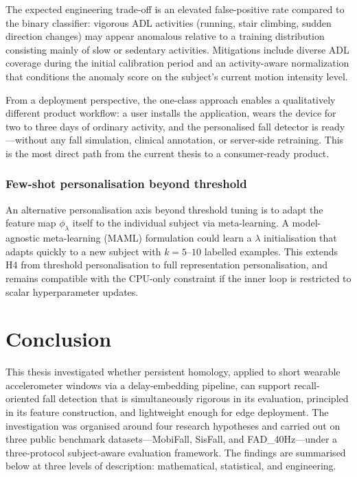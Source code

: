 \documentclass[onluarkali,ingilizce,yukseklisans,karton,LisansustuEgitim]{itutez}
\providecommand{\1}{\mathbf{1}}
\begin{document}
The expected engineering trade-off is an elevated false-positive rate compared to
the binary classifier: vigorous ADL activities (running, stair climbing, sudden
direction changes) may appear anomalous relative to a training distribution consisting
mainly of slow or sedentary activities.  Mitigations include diverse ADL coverage
during the initial calibration period and an activity-aware normalization that
conditions the anomaly score on the subject's current motion intensity level.

From a deployment perspective, the one-class approach enables a qualitatively
different product workflow: a user installs the application, wears the device for
two to three days of ordinary activity, and the personalised fall detector is
ready---without any fall simulation, clinical annotation, or server-side retraining.
This is the most direct path from the current thesis to a consumer-ready product.

\subsection{Few-shot personalisation beyond threshold}

An alternative personalisation axis beyond threshold tuning is to adapt the feature
map $\phi_\lambda$ itself to the individual subject via meta-learning.  A model-agnostic
meta-learning (MAML) formulation could learn a $\lambda$ initialisation that adapts
quickly to a new subject with $k=5$--$10$ labelled examples.  This extends H4 from
threshold personalisation to full representation personalisation, and remains
compatible with the CPU-only constraint if the inner loop is restricted to scalar
hyperparameter updates.



\chapter{Conclusion}
\label{sec:conclusion}

This thesis investigated whether persistent homology, applied to short wearable
accelerometer windows via a delay-embedding pipeline, can support recall-oriented
fall detection that is simultaneously rigorous in its evaluation, principled in its
feature construction, and lightweight enough for edge deployment.  The investigation
was organised around four research hypotheses and carried out on three public
benchmark datasets---MobiFall, SisFall, and FAD\_40Hz---under a three-protocol
subject-aware evaluation framework.  The findings are summarised below at three
levels of description: mathematical, statistical, and engineering.
\end{document}
